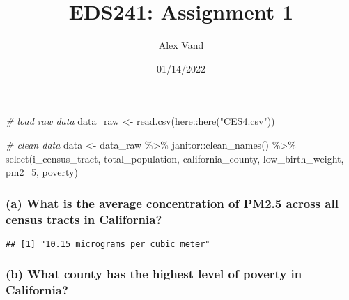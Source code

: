 \documentclass[
]{article}
\title{EDS241: Assignment 1}
\author{Alex Vand}
\date{01/14/2022}
\newenvironment{Shaded}{\begin{snugshade}}{\end{snugshade}}
\newcommand{\CommentTok}[1]{\textcolor[rgb]{0.56,0.35,0.01}{\textit{#1}}}
\newcommand{\DecValTok}[1]{\textcolor[rgb]{0.00,0.00,0.81}{#1}}
\newcommand{\FunctionTok}[1]{\textcolor[rgb]{0.00,0.00,0.00}{#1}}
\newcommand{\NormalTok}[1]{#1}
\newcommand{\OtherTok}[1]{\textcolor[rgb]{0.56,0.35,0.01}{#1}}
\newcommand{\SpecialCharTok}[1]{\textcolor[rgb]{0.00,0.00,0.00}{#1}}
\newcommand{\StringTok}[1]{\textcolor[rgb]{0.31,0.60,0.02}{#1}}
\begin{document}
\maketitle

\begin{Shaded}
\begin{Highlighting}[]
\CommentTok{\# load raw data}
\NormalTok{data\_raw }\OtherTok{\textless{}{-}} \FunctionTok{read.csv}\NormalTok{(here}\SpecialCharTok{::}\FunctionTok{here}\NormalTok{(}\StringTok{"CES4.csv"}\NormalTok{))}

\CommentTok{\# clean data}
\NormalTok{data }\OtherTok{\textless{}{-}}\NormalTok{ data\_raw }\SpecialCharTok{\%\textgreater{}\%}
\NormalTok{          janitor}\SpecialCharTok{::}\FunctionTok{clean\_names}\NormalTok{() }\SpecialCharTok{\%\textgreater{}\%} 
          \FunctionTok{select}\NormalTok{(i\_census\_tract,}
\NormalTok{                 total\_population,}
\NormalTok{                 california\_county,}
\NormalTok{                 low\_birth\_weight,}
\NormalTok{                 pm2\_5,}
\NormalTok{                 poverty)}
\end{Highlighting}
\end{Shaded}

\hypertarget{a-what-is-the-average-concentration-of-pm2.5-across-all-census-tracts-in-california}{%
\subsubsection{(a) What is the average concentration of PM2.5 across all
census tracts in
California?}\label{a-what-is-the-average-concentration-of-pm2.5-across-all-census-tracts-in-california}}

\begin{Shaded}
\end{Shaded}

\begin{verbatim}
## [1] "10.15 micrograms per cubic meter"
\end{verbatim}

\hypertarget{b-what-county-has-the-highest-level-of-poverty-in-california}{%
\subsubsection{(b) What county has the highest level of poverty in
California?}\label{b-what-county-has-the-highest-level-of-poverty-in-california}}
\end{document}
